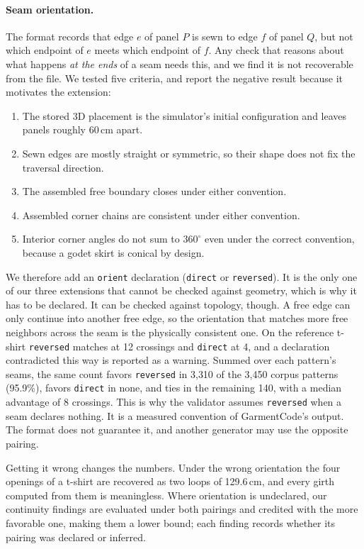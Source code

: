 \documentclass[10pt,twocolumn]{article}
\newcommand{\code}[1]{\texttt{\small #1}}
\begin{document}
\paragraph{Seam orientation.}
\label{par:orient}
The format records that edge $e$ of panel $P$ is sewn to edge $f$ of panel $Q$,
but not which endpoint of $e$ meets which endpoint of $f$. Any check that
reasons about what happens \emph{at the ends} of a seam needs this, and we find
it is not recoverable from the file. We tested five criteria, and report the
negative result because it motivates the extension:

\begin{enumerate}\itemsep1pt
  \item The stored 3D placement is the simulator's initial configuration and
  leaves panels roughly 60\,cm apart.
  \item Sewn edges are mostly straight or symmetric, so their shape does not
  fix the traversal direction.
  \item The assembled free boundary closes under either convention.
  \item Assembled corner chains are consistent under either convention.
  \item Interior corner angles do not sum to $360^\circ$ even under the correct
  convention, because a godet skirt is conical by design.
\end{enumerate}

We therefore add an \code{orient} declaration (\code{direct} or
\code{reversed}). It is the only one of our three extensions that cannot be
checked against geometry, which is why it has to be declared. It can be
checked against topology, though. A free edge can only continue into another
free edge, so the orientation that matches more free neighbors across the seam
is the physically consistent one. On the reference t-shirt \code{reversed} matches
at 12 crossings and \code{direct} at 4, and a declaration contradicted this way
is reported as a warning. Summed over each pattern's seams, the same count
favors \code{reversed} in 3{,}310 of the 3{,}450 corpus patterns (95.9\%),
favors \code{direct} in none, and ties in the remaining 140, with a median
advantage of 8 crossings. This is why the validator assumes \code{reversed}
when a seam declares nothing. It is a measured convention of GarmentCode's
output. The format does not guarantee it, and another generator may use the
opposite pairing.

Getting it wrong changes the numbers. Under the wrong orientation the four
openings of a t-shirt are recovered as two loops of 129.6\,cm, and every girth
computed from them is meaningless. Where orientation is undeclared, our
continuity findings are evaluated under both pairings and credited with the
more favorable one, making them a lower bound; each finding records whether
its pairing was declared or inferred.
\end{document}
